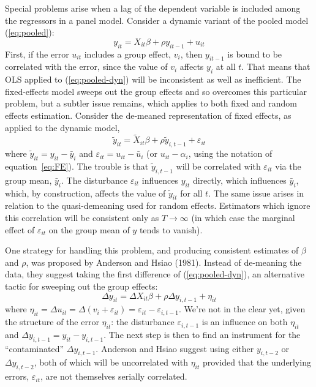 Special problems arise when a lag of the dependent variable is
included among the regressors in a panel model.  Consider a dynamic
variant of the pooled model (\ref{eq:pooled}):
\begin{equation}
\label{eq:pooled-dyn}
y_{it} = X_{it}\beta + \rho y_{it-1} + u_{it}
\end{equation}
First, if the error $u_{it}$ includes a group effect, $v_i$, then
$y_{it-1}$ is bound to be correlated with the error, since the value
of $v_i$ affects $y_i$ at all $t$.  That means that OLS applied to
(\ref{eq:pooled-dyn}) will be inconsistent as well as inefficient.
The fixed-effects model sweeps out the group effects and so overcomes
this particular problem, but a subtler issue remains, which applies to
both fixed and random effects estimation.  Consider the de-meaned
representation of fixed effects, as applied to the dynamic model,
\[
\tilde{y}_{it} = \tilde{X}_{it}\beta + \rho \tilde{y}_{i,t-1} 
  + \varepsilon_{it}
\]
where $\tilde{y}_{it} = y_{it} - \bar{y}_i$ and $\varepsilon_{it} =
u_{it} - \bar{u}_i$ (or $u_{it} - \alpha_i$, using the notation of
equation~\ref{eq:FE}).  The trouble is that $\tilde{y}_{i,t-1}$ will be
correlated with $\varepsilon_{it}$ via the group mean, $\bar{y}_i$.
The disturbance $\varepsilon_{it}$ influences $y_{it}$ directly, which
influences $\bar{y}_i$, which, by construction, affects the value of
$\tilde{y}_{it}$ for all $t$.  The same issue arises in relation to
the quasi-demeaning used for random effects.  Estimators which ignore
this correlation will be consistent only as $T \to \infty$ (in which
case the marginal effect of $\varepsilon_{it}$ on the group mean of 
$y$ tends to vanish).  

One strategy for handling this problem, and producing consistent
estimates of $\beta$ and $\rho$, was proposed by Anderson and Hsiao
(1981).  Instead of de-meaning the data, they suggest taking the first
difference of (\ref{eq:pooled-dyn}), an alternative tactic for
sweeping out the group effects:
\begin{equation}
\label{eq:fe-dyn}
\Delta y_{it} = \Delta X_{it}\beta + \rho \Delta y_{i,t-1} 
  + \eta_{it}
\end{equation}
where $\eta_{it} = \Delta u_{it} = \Delta(v_i + \varepsilon_{it}) =
\varepsilon_{it} - \varepsilon_{i,t-1}$.  We're not in the clear yet,
given the structure of the error $\eta_{it}$: the disturbance
$\varepsilon_{i,t-1}$ is an influence on both $\eta_{it}$ and $\Delta
y_{i,t-1} = y_{it} - y_{i,t-1}$.  The next step is then to find an
instrument for the ``contaminated'' $\Delta y_{i,t-1}$. Anderson and
Hsiao suggest using either $y_{i,t-2}$ or $\Delta y_{i,t-2}$, both of
which will be uncorrelated with $\eta_{it}$ provided that the
underlying errors, $\varepsilon_{it}$, are not themselves serially
correlated.

